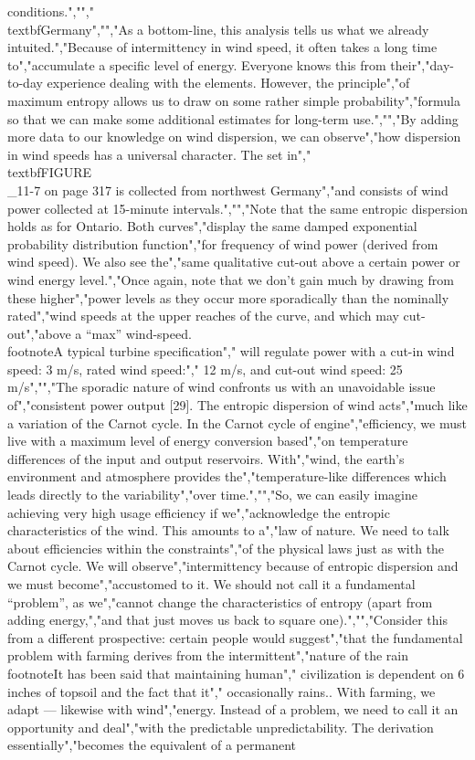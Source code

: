 {{{{{{{conditions.","","\\textbf{Germany}","","As a bottom-line, this analysis tells us what we already intuited.","Because of intermittency in wind speed, it often takes a long time to","accumulate a specific level of energy. Everyone knows this from their","day-to-day experience dealing with the elements. However, the principle","of maximum entropy allows us to draw on some rather simple probability","formula so that we can make some additional estimates for long-term use.","","By adding more data to our knowledge on wind dispersion, we can observe","how dispersion in wind speeds has a universal character. The set in","\\textbf{FIGURE\\_11-7 on page 317} is collected from northwest Germany","and consists of wind power collected at 15-minute intervals.","","Note that the same entropic dispersion holds as for Ontario. Both curves","display the same damped exponential probability distribution function","for frequency of wind power (derived from wind speed). We also see the","same qualitative cut-out above a certain power or wind energy level.","Once again, note that we don't gain much by drawing from these higher","power levels as they occur more sporadically than the nominally rated","wind speeds at the upper reaches of the curve, and which may cut-out","above a ``max'' wind-speed.\\footnote{A typical turbine specification","  will regulate power with a cut-in wind speed: 3 m/s, rated wind speed:","  12 m/s, and cut-out wind speed: 25 m/s}","","The sporadic nature of wind confronts us with an unavoidable issue of","consistent power output {[}29{]}. The entropic dispersion of wind acts","much like a variation of the Carnot cycle. In the Carnot cycle of engine","efficiency, we must live with a maximum level of energy conversion based","on temperature differences of the input and output reservoirs. With","wind, the earth's environment and atmosphere provides the","temperature-like differences which leads directly to the variability","over time.","","So, we can easily imagine achieving very high usage efficiency if we","acknowledge the entropic characteristics of the wind. This amounts to a","law of nature. We need to talk about efficiencies within the constraints","of the physical laws just as with the Carnot cycle. We will observe","intermittency because of entropic dispersion and we must become","accustomed to it. We should not call it a fundamental ``problem'', as we","cannot change the characteristics of entropy (apart from adding energy,","and that just moves us back to square one).","","Consider this from a different prospective: certain people would suggest","that the fundamental problem with farming derives from the intermittent","nature of the rain\\footnote{It has been said that maintaining human","  civilization is dependent on 6 inches of topsoil and the fact that it","  occasionally rains.}. With farming, we adapt --- likewise with wind","energy. Instead of a problem, we need to call it an opportunity and deal","with the predictable unpredictability. The derivation essentially","becomes the equivalent of a permanent }}}}}}}
